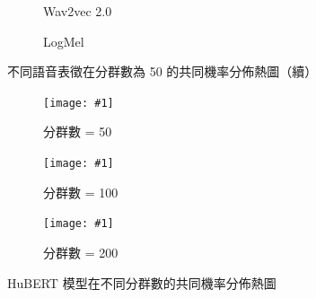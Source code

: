 {\begin{figure}
          \begin{subfigure}{\textwidth}  %
         \centering
         \caption{Wav2vec 2.0}
         \label{fig:ch3-heatmap-model--w2v2-50-joint-byprob}
     \end{subfigure}
     
     \vfill
     \begin{subfigure}{\textwidth}  %
         \centering
         \caption{LogMel}
         \label{fig:ch3-heatmap-model--logmel-50-joint-byprob}
     \end{subfigure}
     \caption{不同語音表徵在分群數為 50 的共同機率分佈熱圖（續）}
     \label{fig:ch3-heatmap-model-comparison--part2}
\end{figure}

}  %

{

\newcommand{\jeffheightt}[1]{\texttt{[image: \#1]}}

\begin{figure}
     \centering
     \begin{subfigure}{\textwidth}  %
         \centering
         \jeffheightt{figures/hubert-50-joint-byprob--new2.png}
         \caption{分群數 = 50}
         \label{fig:ch3-heatmap-cluster--hubert-50-joint-byprob}
     \end{subfigure}
     \vfill

     \begin{subfigure}{\textwidth}  %
         \centering
         \jeffheightt{figures/hubert-100-joint-byprob---new2.png}
         \caption{分群數 = 100}
         \label{fig:ch3-heatmap-cluster--hubert-100-joint-byprob}
     \end{subfigure}

    \vfill

     \begin{subfigure}{\textwidth}  %
         \centering
         \jeffheightt{figures/hubert-200-joint-byprob.png}
         \caption{分群數 = 200}
         \label{fig:ch3-heatmap-cluster--hubert-200-joint-byprob}
     \end{subfigure}

     \caption{HuBERT 模型在不同分群數的共同機率分佈熱圖}
     \label{fig:hubert-comparison}
\end{figure}

}

